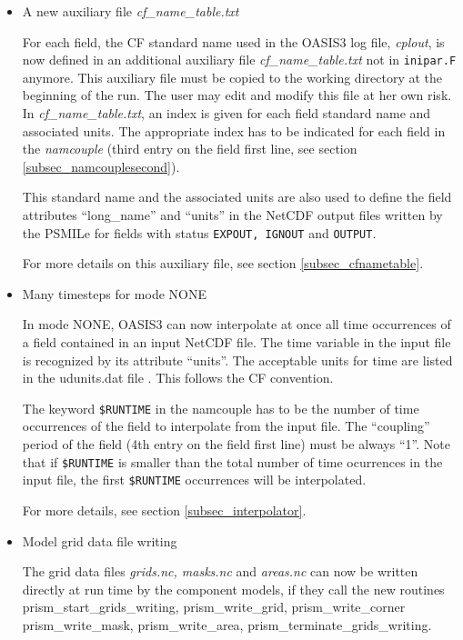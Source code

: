 \begin{itemize}
\item A new auxiliary file {\em cf\_name\_table.txt}

For each field, the CF standard name used in the OASIS3 log file, {\em
cplout}, is now defined in an additional auxiliary file {\em
cf\_name\_table.txt} 
not in {\tt inipar.F} anymore. This auxiliary file must be
copied to the working directory at the beginning of the run. The user
may edit and modify this file at her own risk. In {\em
cf\_name\_table.txt}, an index is given for each field standard name
and associated units.  The appropriate index has to be indicated for
each field in the {\em namcouple} (third entry on the field first
line, see section \ref{subsec_namcouplesecond}). 

This standard name and the associated units are also used to define the
field attributes ``long\_name'' and ``units'' in the NetCDF output files
written by the PSMILe for fields with status {\tt EXPOUT, IGNOUT} and
{\tt OUTPUT}.
 
For more details on this auxiliary file, see section
\ref{subsec_cfnametable}.

\item Many timesteps for mode NONE

In mode NONE, OASIS3 can now interpolate at once all time occurrences
of a field contained in an input NetCDF file. The time variable in the
input file is recognized by its attribute ``units''. The acceptable
units for time are listed in the udunits.dat file \cite{udunits}. This
follows the CF convention.

The keyword {\tt \$RUNTIME} in the namcouple has to be the number of time
occurrences of the field to interpolate from the input file. The
``coupling'' period of the field (4th entry on the field first line)
must be always ``1''. Note that if {\tt \$RUNTIME} is smaller than the
total number of time ocurrences in the input file, the first {\tt \$RUNTIME} 
occurrences will be interpolated.

For more details, see section \ref{subsec_interpolator}.

\item Model grid data file writing

The grid data files {\em grids.nc, masks.nc} and {\em areas.nc} can
now be written directly at run time by the component models, if they
call the new routines prism\_start\_grids\_writing, prism\_write\_grid,
prism\_write\_corner prism\_write\_mask, prism\_write\_area,
prism\_terminate\_grids\_writing. 


\end{itemize}
